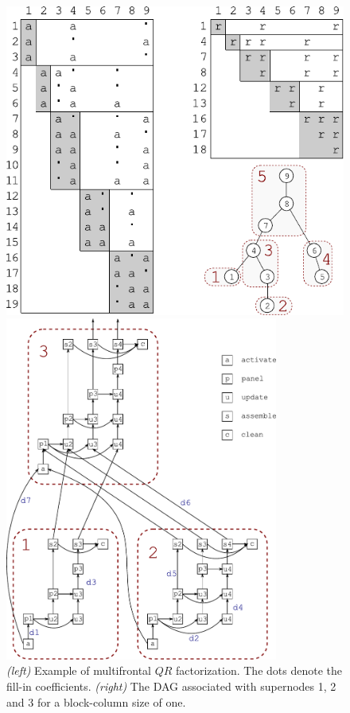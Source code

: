 \documentclass[11pt]{article}
\begin{document}
\begin{figure}[ht]
\begin{minipage}[b]{0.5\textwidth}
\centering
  \includegraphics[width=\textwidth]{figures/mfront}
\end{minipage}
\hspace{0.5cm}
\begin{minipage}[b]{0.5\textwidth}
\centering
  \includegraphics[width=0.8\textwidth]{figures/dag}
\end{minipage}
\caption{\label{fig:qrmfront}{\it (left)} Example of multifrontal $QR$
  factorization. The dots denote the fill-in coefficients. {\it
    (right)} The DAG associated with supernodes 1, 2 and 3 for a
  block-column size of one.}
\end{figure}
\end{document}
